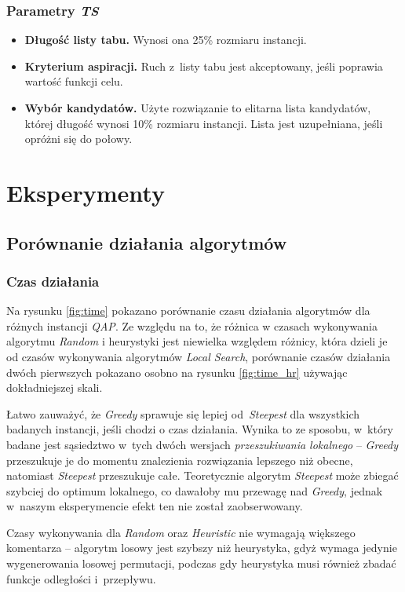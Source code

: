 \documentclass{article}
\begin{document}
		\subsubsection{Parametry \emph{TS}}
			\begin{itemize}
				\item{\textbf{Długość listy tabu.} Wynosi ona 25\% rozmiaru instancji.}
				\item{\textbf{Kryterium aspiracji.} Ruch z~listy tabu jest akceptowany, jeśli poprawia wartość funkcji celu.}
				\item{\textbf{Wybór kandydatów.} Użyte rozwiązanie to elitarna lista kandydatów, której długość wynosi 10\% rozmiaru instancji. Lista jest uzupełniana, jeśli opróżni się do połowy.}
			\end{itemize}
\section{Eksperymenty}
	\subsection{Porównanie działania algorytmów}
		\subsubsection{Czas działania}


			Na rysunku \ref{fig:time} pokazano porównanie czasu działania algorytmów dla różnych instancji \emph{QAP}. Ze względu na to, że różnica w czasach wykonywania algorytmu \emph{Random} i heurystyki jest niewielka względem różnicy, która dzieli je od czasów wykonywania algorytmów \emph{Local Search}, porównanie czasów działania dwóch pierwszych pokazano osobno na rysunku \ref{fig:time_hr} używając dokładniejszej skali.


			Łatwo zauważyć, że \emph{Greedy} sprawuje się lepiej od~\emph{Steepest} dla wszystkich badanych instancji, jeśli chodzi o czas działania. Wynika to ze sposobu, w~który badane jest sąsiedztwo w~tych dwóch wersjach \emph{przeszukiwania lokalnego} -- \emph{Greedy} przeszukuje je do momentu znalezienia rozwiązania lepszego niż obecne, natomiast \emph{Steepest} przeszukuje całe. Teoretycznie algorytm \emph{Steepest} może zbiegać szybciej do optimum lokalnego, co dawałoby mu przewagę nad \emph{Greedy}, jednak w~naszym eksperymencie efekt ten nie został zaobserwowany.


			Czasy wykonywania dla \emph{Random} oraz \emph{Heuristic} nie wymagają większego komentarza -- algorytm losowy jest szybszy niż heurystyka, gdyż wymaga jedynie wygenerowania losowej permutacji, podczas gdy heurystyka musi również zbadać funkcje odległości i~przepływu.
\end{document}
